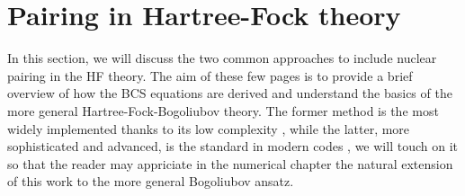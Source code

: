 \section{Pairing in Hartree-Fock theory}
\label{sec:pairing_hf}
In this section, we will discuss the two common approaches to include nuclear pairing in the HF theory. The aim of these few pages is to provide a brief overview of how the BCS equations are derived and understand the basics of the more general Hartree-Fock-Bogoliubov theory. The former method is the most widely implemented thanks to its low complexity \cite{hfbcsqrpa,oldEv8,skyax}, while the latter, more sophisticated and advanced, is the standard in modern codes \cite{hfodd, hfbftt,MAREVIC2022108367}, we will touch on it so that the reader may appriciate in the numerical chapter the natural extension of this work to the more general Bogoliubov ansatz. 
